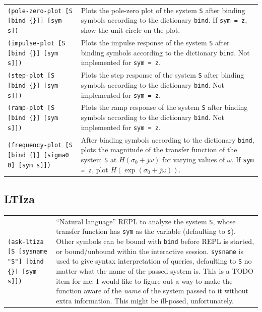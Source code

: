 \documentclass[11pt,letter]{article}
\begin{document}
\begin{longtable}{ p{} p{} }
  \texttt{(pole-zero-plot [S [bind \{\}]] [sym s])}
  &
  Plots the pole-zero plot of the system \texttt{S} after binding symbols according to the dictionary \texttt{bind}.
  If \lstinline!sym = z!, show the unit circle on the plot. \\

  \texttt{(impulse-plot [S [bind \{\}] [sym s]])}
  &
  Plots the impulse response of the system \texttt{S} after binding symbols according to the dictionary \texttt{bind}.
  Not implemented for \lstinline!sym = z!. \\

  \texttt{(step-plot [S [bind \{\}] [sym s]])}
  &
  Plots the step response of the system \texttt{S} after binding symbols according to the dictionary \texttt{bind}.
  Not implemented for \lstinline!sym = z!. \\

  \texttt{(ramp-plot [S [bind \{\}] [sym s]])}
  &
  Plots the ramp response of the system \texttt{S} after binding symbols according to the dictionary \texttt{bind}.
  Not implemented for \lstinline!sym = z!. \\

  \texttt{(frequency-plot [S [bind \{\}] [sigma0 0] [sym s]])}
  &
  After binding symbols according to the dictionary \texttt{bind}, plots the magnitude of the transfer function of the system \texttt{S} at $H(\sigma_0+j\omega)$ for varying values of $\omega$.
  If \lstinline!sym = z!, plot $H(\exp(\sigma_0+j\omega))$.
\end{longtable}

\subsection{LTIza}\label{sec:reference:ltiza}

\begin{longtable}{ p{} p{} }
  \texttt{(ask-ltiza [S [sysname "S"] [bind \{\}] [sym s]])}
  &
  ``Natural language'' REPL to analyze the system \lstinline!S!, whose transfer function has \lstinline!sym! as the variable (defaulting to \lstinline!s!).
  Other symbols can be bound with \lstinline!bind! before REPL is started, or bound/unbound within the interactive session.
  \lstinline!sysname! is used to give syntax interpretation of queries, defaulting to \lstinline!S! no matter what the name of the passed system is.
  This is a TODO item for me: I would like to figure out a way to make the function aware of the \emph{name} of the system passed to it without extra information. This might be ill-posed, unfortunately. \\
\end{longtable}
\end{document}

